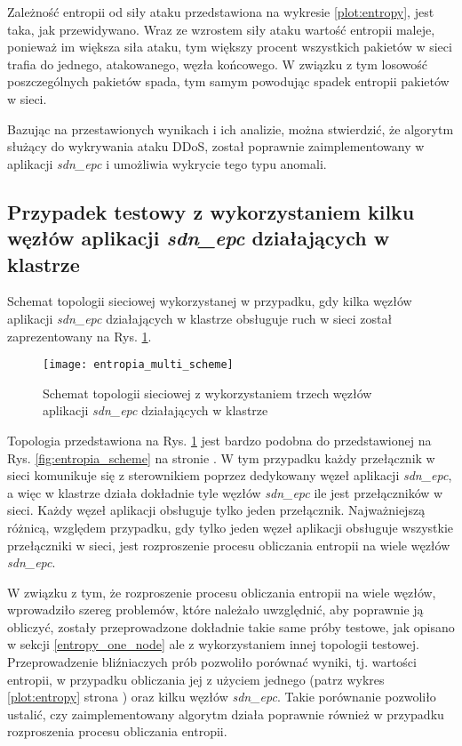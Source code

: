Zależność entropii od siły ataku przedstawiona na wykresie \ref{plot:entropy},
jest taka, jak przewidywano. Wraz ze wzrostem siły ataku wartość entropii
maleje, ponieważ im większa siła ataku, tym większy procent wszystkich pakietów
w sieci trafia do jednego, atakowanego, węzła końcowego. W związku z tym
losowość poszczególnych pakietów spada, tym samym powodując spadek entropii
pakietów w sieci.

Bazując na przestawionych wynikach i ich analizie, można stwierdzić, że algorytm
służący do wykrywania ataku DDoS, został poprawnie zaimplementowany w aplikacji
\textit{sdn\_epc} i umożliwia wykrycie tego typu anomali. 

\subsection{Przypadek testowy z wykorzystaniem kilku węzłów aplikacji
  \textit{sdn\_epc} działających w klastrze} \label{entropy_multi_node}

Schemat topologii sieciowej wykorzystanej w przypadku, gdy kilka węzłów
aplikacji \textit{sdn\_epc} działających w klastrze obsługuje ruch w sieci
został zaprezentowany na Rys. \ref{fig:entropia_multi_scheme}.
\newpage

\begin{figure}[h]
\centering
\texttt{[image: entropia\_multi\_scheme]}
\caption{Schemat topologii sieciowej z wykorzystaniem trzech węzłów aplikacji
  \textit{sdn\_epc} działających w klastrze}
\label{fig:entropia_multi_scheme}
\end{figure}

Topologia przedstawiona na Rys. \ref{fig:entropia_multi_scheme} jest bardzo
podobna do przedstawionej na Rys. \ref{fig:entropia_scheme} na stronie
\pageref{fig:entropia_scheme}. W tym przypadku każdy przełącznik w sieci
komunikuje się z sterownikiem poprzez dedykowany węzeł aplikacji
\textit{sdn\_epc}, a więc w klastrze działa dokładnie tyle węzłów
\textit{sdn\_epc} ile jest przełączników w sieci. Każdy węzeł aplikacji
obsługuje tylko jeden przełącznik. Najważniejszą różnicą, względem przypadku,
gdy tylko jeden węzeł aplikacji obsługuje wszystkie przełączniki w sieci, jest
rozproszenie procesu obliczania entropii na wiele węzłów \textit{sdn\_epc}.

W związku z tym, że rozproszenie procesu obliczania entropii na wiele węzłów,
wprowadziło szereg problemów, które należało uwzględnić, aby poprawnie ją
obliczyć, zostały przeprowadzone dokładnie takie same próby testowe, jak opisano
w sekcji \ref{entropy_one_node} ale z wykorzystaniem innej topologii testowej.
Przeprowadzenie bliźniaczych prób pozwoliło porównać wyniki, tj. wartości
entropii, w przypadku obliczania jej z użyciem jednego (patrz wykres
\ref{plot:entropy} strona \pageref{plot:entropy}) oraz kilku węzłów
\textit{sdn\_epc}. Takie porównanie pozwoliło ustalić, czy zaimplementowany
algorytm działa poprawnie również w przypadku rozproszenia procesu obliczania
entropii.

